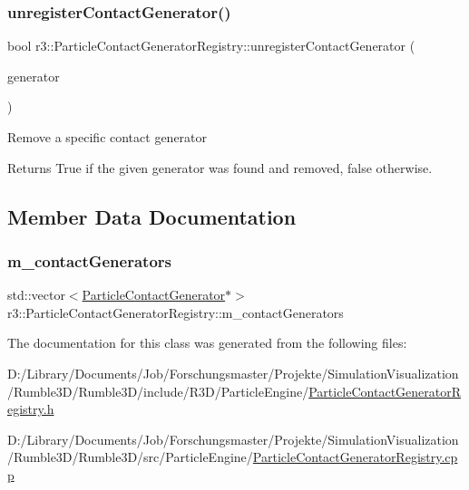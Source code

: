 \subsubsection{\texorpdfstring{unregister\+Contact\+Generator()}{unregisterContactGenerator()}}
{\footnotesize\ttfamily bool r3\+::\+Particle\+Contact\+Generator\+Registry\+::unregister\+Contact\+Generator (\begin{DoxyParamCaption}\item[{\mbox{\hyperlink{classr3_1_1_particle_contact_generator}{Particle\+Contact\+Generator}} $\ast$}]{generator }\end{DoxyParamCaption})}

Remove a specific contact generator \begin{DoxyReturn}{Returns}
True if the given generator was found and removed, false otherwise. 
\end{DoxyReturn}


\subsection{Member Data Documentation}
\mbox{\label{classr3_1_1_particle_contact_generator_registry_abefd730c20539681ed0fac53ccd5f8ab}} 
\subsubsection{\texorpdfstring{m\+\_\+contact\+Generators}{m\_contactGenerators}}
{\footnotesize\ttfamily std\+::vector$<$\mbox{\hyperlink{classr3_1_1_particle_contact_generator}{Particle\+Contact\+Generator}}$\ast$$>$ r3\+::\+Particle\+Contact\+Generator\+Registry\+::m\+\_\+contact\+Generators\hspace{0.3cm}{\ttfamily [protected]}}



The documentation for this class was generated from the following files\+:\begin{DoxyCompactItemize}
\item 
D\+:/\+Library/\+Documents/\+Job/\+Forschungsmaster/\+Projekte/\+Simulation\+Visualization/\+Rumble3\+D/\+Rumble3\+D/include/\+R3\+D/\+Particle\+Engine/\mbox{\hyperlink{_particle_contact_generator_registry_8h}{Particle\+Contact\+Generator\+Registry.\+h}}\item 
D\+:/\+Library/\+Documents/\+Job/\+Forschungsmaster/\+Projekte/\+Simulation\+Visualization/\+Rumble3\+D/\+Rumble3\+D/src/\+Particle\+Engine/\mbox{\hyperlink{_particle_contact_generator_registry_8cpp}{Particle\+Contact\+Generator\+Registry.\+cpp}}\end{DoxyCompactItemize}
